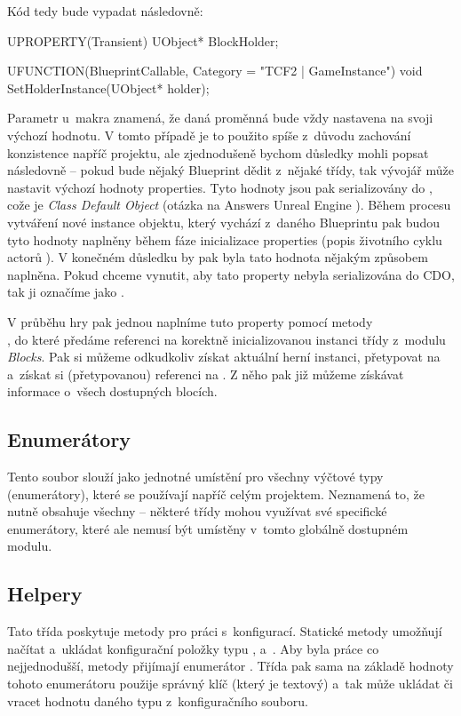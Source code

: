 Kód tedy bude vypadat následovně:
\begin{code}
	UPROPERTY(Transient)
		UObject* BlockHolder;

	UFUNCTION(BlueprintCallable, Category = "TCF2 | GameInstance")
		void SetHolderInstance(UObject* holder);
\end{code}
 Parametr  u~makra  znamená, že daná proměnná bude vždy nastavena na svoji výchozí hodnotu. V tomto případě je to použito spíše z~důvodu zachování konzistence napříč projektu, ale zjednodušeně bychom důsledky mohli popsat následovně -- pokud bude nějaký Blueprint dědit z~nějaké \CPP{} třídy, tak vývojář může nastavit výchozí hodnoty properties. Tyto hodnoty jsou pak serializovány do \CDO{}, cože je \textit{Class Default Object} (otázka na Answers Unreal Engine \citep{ue_cdo}). Během procesu vytváření nové instance objektu, který vychází z~daného Blueprintu pak budou tyto hodnoty naplněny během fáze inicializace properties (popis životního cyklu actorů \citep{ue_actor_life}). V konečném důsledku by pak byla tato hodnota nějakým způsobem naplněna. Pokud chceme vynutit, aby tato property nebyla serializována do CDO, tak ji označíme jako .

V průběhu hry pak jednou naplníme tuto property pomocí metody\\ , do které předáme referenci na korektně inicializovanou instanci třídy  z~modulu \textit{Blocks}. Pak si můžeme odkudkoliv získat aktuální herní instanci, přetypovat na  a~získat si (přetypovanou) referenci na . Z něho pak již můžeme získávat informace o~všech dostupných blocích.

\subsection{Enumerátory}

Tento soubor slouží jako jednotné umístění pro všechny výčtové typy (enumerátory), které se používají napříč celým projektem. Neznamená to, že nutně obsahuje všechny -- některé třídy mohou využívat své specifické enumerátory, které ale nemusí být umístěny v~tomto globálně dostupném modulu.


\subsection{Helpery}

 Tato třída poskytuje metody pro práci s~konfigurací. Statické metody umožňují načítat a~ukládat konfigurační položky typu ,  a~.
Aby byla práce co nejjednodušší, metody přijímají enumerátor . Třída pak sama na základě hodnoty tohoto enumerátoru použije správný klíč (který je textový) a~tak může ukládat či vracet hodnotu daného typu z~konfiguračního souboru.